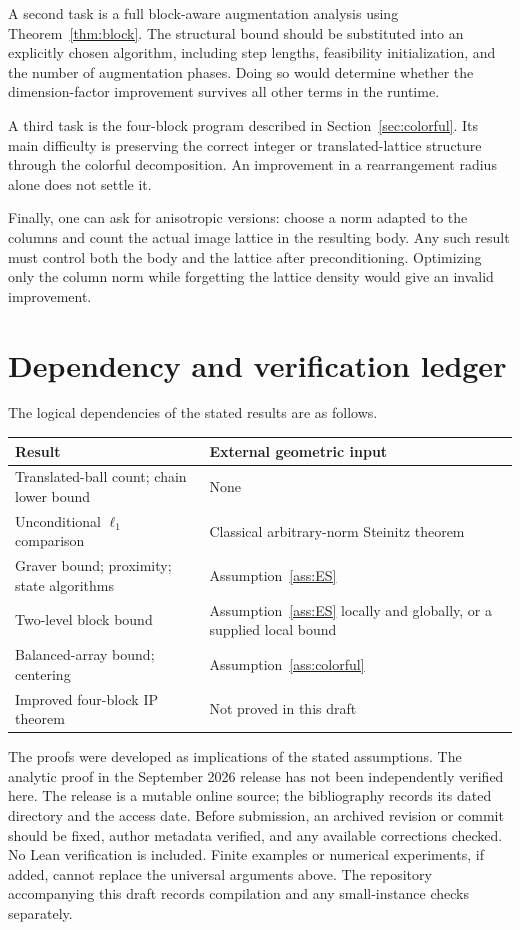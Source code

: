 \documentclass[11pt]{article}
\theoremstyle{definition}
\theoremstyle{remark}
\begin{document}
A second task is a full block-aware augmentation analysis using
Theorem~\ref{thm:block}. The structural bound should be substituted into
an explicitly chosen algorithm, including step lengths, feasibility
initialization, and the number of augmentation phases. Doing so would
determine whether the dimension-factor improvement survives all other
terms in the runtime.

A third task is the four-block program described in
Section~\ref{sec:colorful}. Its main difficulty is preserving the correct
integer or translated-lattice structure through the colorful decomposition.
An improvement in a rearrangement radius alone does not settle it.

Finally, one can ask for anisotropic versions: choose a norm adapted to
the columns and count the actual image lattice in the resulting body.
Any such result must control both the body and the lattice after
preconditioning. Optimizing only the column norm while forgetting the
lattice density would give an invalid improvement.

\appendix
\section{Dependency and verification ledger}

The logical dependencies of the stated results are as follows.
\begin{center}
\begin{tabular}{>{\raggedright\arraybackslash}p{}>{\raggedright\arraybackslash}p{}}
\toprule
Result & External geometric input\\
\midrule
Translated-ball count; chain lower bound & None\\
Unconditional $\ell_1$ comparison & Classical arbitrary-norm Steinitz theorem\\
Graver bound; proximity; state algorithms & Assumption~\ref{ass:ES}\\
Two-level block bound & Assumption~\ref{ass:ES} locally and globally, or a supplied local bound\\
Balanced-array bound; centering & Assumption~\ref{ass:colorful}\\
Improved four-block IP theorem & Not proved in this draft\\
\bottomrule
\end{tabular}
\end{center}

The proofs were developed as implications of the stated assumptions.
The analytic proof in the September 2026 release has not been independently
verified here. The release is a mutable online source; the bibliography
records its dated directory and the access date. Before submission, an
archived revision or commit should be fixed, author metadata verified,
and any available corrections checked. No Lean verification is included.
Finite examples or numerical experiments, if added, cannot replace the
universal arguments above. The repository accompanying this draft records
compilation and any small-instance checks separately.
\end{document}
